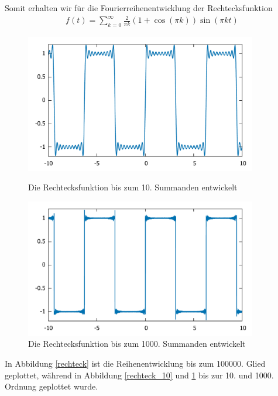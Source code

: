 Somit erhalten wir für die Fourierreihenentwicklung der Rechtecksfunktion
                \begin{align*}
                   f(t) = \sum_{k=0}^\infty \frac{2}{\pi k} (1 + \cos(\pi k)) 
                   \sin(\pi k t) 
                \end{align*}
                \begin{figure}[htbp]
                  \begin{minipage}{0.45\textwidth}
                   \centering
                    \includegraphics[width=0.9\textwidth]{Abb/rechteck_10}
                    \caption{Die Rechtecksfunktion bis zum 10. Summanden entwickelt}
                    \label{rechteck_10}
                  \end{minipage}\hfill
                  \begin{minipage}{0.45\textwidth}
                   \centering
                    \includegraphics[width=0.9\textwidth]{Abb/rechteck_1000.pdf}
                    \caption{Die Rechtecksfunktion bis zum 1000. Summanden entwickelt}
                    \label{reckteck_1000}
                  \end{minipage}
                \end{figure}
In Abbildung \ref{rechteck} ist die Reihenentwicklung bis zum 100000. Glied 
geplottet, während in Abbildung \ref{rechteck_10} und \ref{reckteck_1000} bis zur 
10. und 1000. Ordnung geplottet wurde. 

